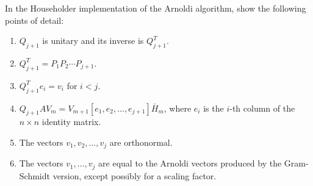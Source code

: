 \documentclass{ctexart}
\newif\ifpreface
\begin{document}
\large
\setlength{\baselineskip}{1.2em}
\ifpreface

\newgeometry{left=2cm,right=2cm,top=2cm,bottom=2cm}
\else
{}
\maketitle
\fi
\begin{problem}
  In the Householder implementation of the Arnoldi algorithm, show the following points of detail:
  \begin{enumerate}[label=(\alph*)]
    \item $Q_{j+1}$ is unitary and its inverse is $Q_{j+1}^{T}$.
    \item $Q_{j+1}^{T} = P_1 P_2 \cdots P_{j+1}$.
    \item $Q_{j+1}^{T} e_i = v_i$ for $i < j$.
    \item $Q_{j+1} A V_m = V_{m+1} [e_1, e_2, \ldots, e_{j+1}] \bar{H}_m$, where $e_i$ is the $i$-th column of the $n \times n$ identity matrix.
    \item The vectors $v_1, v_2, \ldots, v_j$ are orthonormal.
    \item The vectors $v_1, \ldots, v_j$ are equal to the Arnoldi vectors produced by the Gram-Schmidt version, except possibly for a scaling factor.
  \end{enumerate}
\end{problem}
\end{document}
